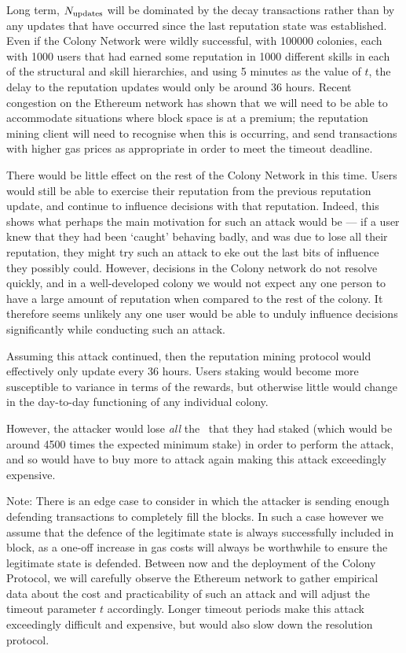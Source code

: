Long term, $N_{\rm updates}$ will be dominated by the decay transactions rather than by any updates that have occurred since the last reputation state was established. Even if the Colony Network were wildly successful, with 100000 colonies, each with 1000 users that had earned some reputation in 1000 different skills in each of the structural and skill hierarchies, and using 5 minutes as the value of $t$, the delay to the reputation updates would only be around $36$ hours. Recent congestion on the Ethereum network has shown that we will need to be able to accommodate situations where block space is at a premium; the reputation mining client will need to recognise when this is occurring, and send transactions with higher gas prices as appropriate in order to meet the timeout deadline.

There would be little effect on the rest of the Colony Network in this time. Users would still be able to exercise their reputation from the previous reputation update, and continue to influence decisions with that reputation. Indeed, this shows what perhaps the main motivation for such an attack would be --- if a user knew that they had been `caught' behaving badly, and was due to lose all their reputation, they might try such an attack to eke out the last bits of influence they possibly could. However, decisions in the Colony network do not resolve quickly, and in a well-developed colony we would not expect any one person to have a large amount of reputation when compared to the rest of the colony. It therefore seems unlikely any one user would be able to unduly influence decisions significantly while conducting such an attack.

Assuming this attack continued, then the reputation mining protocol would effectively only update every 36 hours. Users staking would become more susceptible to variance in terms of the rewards, but otherwise little would change in the day-to-day functioning of any individual colony.

However, the attacker would lose \emph{all} the \rct\ that they had staked (which would be around 4500 times the expected minimum stake) in order to perform the attack, and so would have to buy more to attack again making this attack exceedingly expensive.


Note: There is an edge case to consider in which the attacker is sending enough defending transactions to completely fill the blocks. In such a case however we assume that the defence of the legitimate state is always successfully included in block, as a one-off increase in gas costs will always be worthwhile to ensure the legitimate state is defended. Between now and the deployment of the Colony Protocol, we will carefully observe the Ethereum network to gather empirical data about the cost and practicability of such an attack and will adjust the timeout parameter $t$ accordingly. Longer timeout periods make this attack exceedingly difficult and expensive, but would also slow down the resolution protocol.

